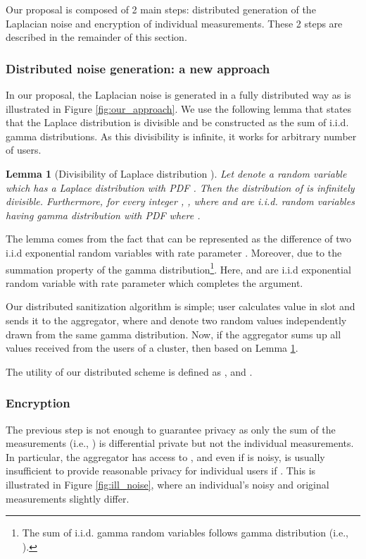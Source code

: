 \documentclass[11pt,a4paper]{article}
\theoremstyle{plain}
\theoremstyle{plain}
\theoremstyle{plain}
\theoremstyle{plain}
\newtheorem{lemma}{Lemma}
\theoremstyle{nonumberplain} \theoremseparator{}
\begin{document}
Our proposal is composed of 2 main steps: distributed generation of the Laplacian noise and encryption of individual measurements. These 2 steps are described in the remainder of this section.


\subsubsection{Distributed noise generation: a new approach}
In our proposal, the Laplacian noise is generated in a fully distributed way as is illustrated in Figure \ref{fig:our_approach}.  We use
the following lemma that states that the Laplace distribution is divisible and be constructed as the sum of i.i.d. gamma distributions. As this divisibility is infinite, it works for arbitrary number of users.   

\begin{lemma}[Divisibility of Laplace distribution \cite{kotz01book}]
\label{lem:gamma}
Let  denote a random variable which has a Laplace distribution with PDF . Then the distribution of  is infinitely divisible. Furthermore, for every integer , , where  and  are i.i.d. random variables having gamma distribution with PDF  where .  
\end{lemma}

The lemma comes from the fact that  can be represented as the difference of two i.i.d exponential random variables with rate parameter . Moreover,  due to the summation property of the gamma distribution\footnote{The sum of i.i.d. gamma random variables follows gamma distribution (i.e., ).}. Here,  and  are i.i.d exponential random variable with rate parameter  which completes the argument. 

Our distributed sanitization algorithm is simple; user  calculates value  in slot  and sends it to the aggregator, where  and  denote two random values independently drawn from the same gamma distribution. Now, if the aggregator sums up all values received
from the  users of a cluster, then  based on Lemma \ref{lem:gamma}.  

The utility of our distributed scheme is defined as , and .

\subsubsection{Encryption} 
\label{sec:enc}

The previous step is not enough to guarantee
privacy as only the sum of the measurements (i.e., ) is differential private
but not the individual measurements. In particular, the aggregator has access to , 
and even if  is noisy,  is
usually insufficient to provide reasonable privacy for individual users if . This is illustrated in Figure \ref{fig:ill_noise}, where an individual's noisy and original measurements slightly differ.
\end{document}
